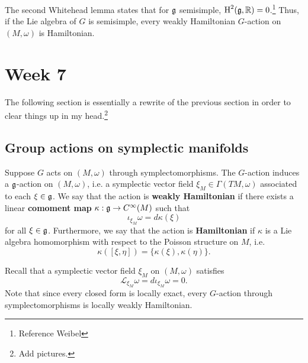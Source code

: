 \documentclass{amsart}
\begin{document}
\begin{example}
    The second Whitehead lemma states that for $\mathfrak g$ semisimple, $\operatorname{H}^2(\mathfrak g,\mathbb{R})=0$.\footnote{Reference Weibel}
    Thus, if the Lie algebra of $G$ is semisimple, every weakly Hamiltonian $G$-action on
    $(M,\omega)$ is Hamiltonian.
\end{example}

\newpage
\section{Week 7}

The following section is essentially a rewrite of the previous section in order
to clear things up in my head.\footnote{Add pictures.}

\subsection{Group actions on symplectic manifolds}

\begin{definition}
    Suppose $G$ acts on $(M,\omega)$ through symplectomorphisms. The $G$-action
    induces a $\mathfrak g$-action on $(M,\omega)$, i.e. a symplectic vector field $\xi_M\in\Gamma(TM,\omega)$
    associated to each $\xi\in\mathfrak g$. We say that the action is \textbf{weakly Hamiltonian}
    if there exists a linear \textbf{comoment map} $\kappa:\mathfrak g\to C^\infty(M)$ such
    that
    \begin{equation*}
        \iota_{\xi_M}\omega = d\kappa(\xi)
    \end{equation*}
    for all $\xi\in\mathfrak g$. Furthermore, we say that the action is \textbf{Hamiltonian}
    if $\kappa$ is a Lie algebra homomorphism with respect to the Poisson structure on $M$,
    i.e.
    \begin{equation*}
        \kappa([\xi,\eta]) = \{\kappa(\xi),\kappa(\eta)\}.
    \end{equation*}
\end{definition}

\begin{remark}
    Recall that a symplectic vector field $\xi_M$ on $(M,\omega)$ satisfies
    \begin{equation*}
        \mathcal{L}_{\xi_M}\omega = d\iota_{\xi_M}\omega = 0.
    \end{equation*}
    Note that since every closed form is locally exact, every $G$-action through symplectomorphisms
    is locally weakly Hamiltonian.
    \label{rem:lwh}
\end{remark}
\end{document}
